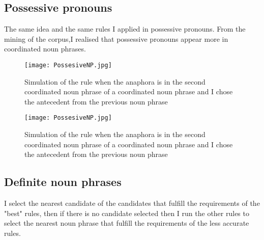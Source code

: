 \newpage
\subsection{Possessive pronouns}

The same idea and the same rules I applied in possessive pronouns. From the mining of the corpus,I realised that possessive pronouns appear more in coordinated noun phrases. 
\begin{figure}[h]
  \begin{center}
	\texttt{[image: PossesiveNP.jpg]} 
 	\caption["to document"]{Simulation of  the rule when the anaphora  is in the second coordinated noun phrase of a coordinated noun phrase and I chose the antecedent from the previous noun phrase\footnotemark}
	\label{Figure 14}
  \end{center}
 \end{figure}
 
\newpage

\begin{figure}[h]
  \begin{center}
	\texttt{[image: PossesiveNP.jpg]} 
 	\caption[Caption for LOF]{Simulation of  the rule when the anaphora  is in the second coordinated noun phrase of a coordinated noun phrase and I chose the antecedent from the previous noun phrase\footnotemark}
	\label{Figure 15}
  \end{center}
\end{figure}


\subsection{Definite noun phrases} 

I select the nearest candidate of the candidates that fulfill the requirements of the "best" rules, then if there is no candidate selected then I run the other rules to select the nearest noun phrase that fulfill the requirements of the less accurate rules.  

